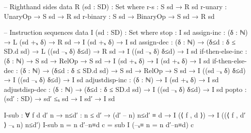 \documentclass{article}
\begin{document}
\begin{prev}
\begin{code}
-- Righthand sides
data R (sd : SD) : Set where
    r-s : S sd → R sd
    r-unary : UnaryOp → S sd → R sd
    r-binary : S sd → BinaryOp → S sd → R sd

-- Instruction sequences
data I (sd : SD) : Set where
    stop : I sd
    assign-inc : (δ : ℕ) → L (sd +ₛ δ) → R sd → I (sd +ₛ δ) → I sd
    assign-dec : (δ : ℕ) → (δ≤d : δ ≤ SD.d sd) → L ((sd –ₛ δ) δ≤d) 
                    → R sd → I ((sd –ₛ δ) δ≤d) → I sd
    if-then-else-inc : (δ : ℕ) → S sd → RelOp → S sd 
                            → I (sd +ₛ δ) → I (sd +ₛ δ) → I sd
    if-then-else-dec : (δ : ℕ) → (δ≤d : δ ≤ SD.d sd) 
                            → S sd → RelOp → S sd 
                            → I ((sd –ₛ δ) δ≤d) 
                            → I ((sd –ₛ δ) δ≤d) → I sd
    adjustdisp-inc : (δ : ℕ) → I (sd +ₛ δ) → I sd
    adjustdisp-dec : (δ : ℕ) → (δ≤d : δ ≤ SD.d sd) 
                        → I ((sd –ₛ δ) δ≤d) → I sd
    popto : (sd′ : SD) → sd′ ≤ₛ sd → I sd′ → I sd 


I-sub : ∀ {f d d′ n} → {n≤d′ : n ≤ d′} → (d′ – n) n≤d′ ≡ d 
            → I (⟨ f , d ⟩) → I ((⟨ f , d′ ⟩ –ₛ n) n≤d′)
I-sub {n = n} d′–n≡d c = sub I (–ₛ≡ {n = n} d′–n≡d) c
\end{code}
\end{prev}
\end{document}

